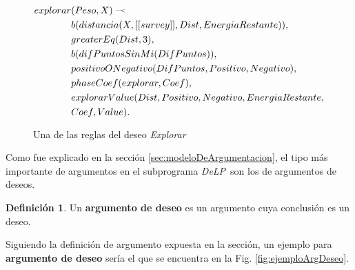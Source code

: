 \documentclass[oneside]{book}
\theoremstyle{definition}
\newtheorem{definicion}{Definición}[section]
\theoremstyle{example}
\newcommand{\DLP}{\mbox{\textit{DeLP}}}
\newcommand{\drule}[2]{\mbox{$ #1\; \defleftarrow \; #2$}}
\newcommand{\defleftarrow}{{\raise1.5pt\hbox{\tiny\defleft}}}
\newcommand{\defleft}{\mbox{---\hspace{-1.5pt}\raise.05pt\hbox{$<$}}}
\newcommand{\bigAS}[2]{$\bigl\langle \{#1\}, #2 \bigr\rangle $}
\newcommand{\nlA}[1]{$$\mbox{#1}$$}
\begin{document}
\begin{figure}
\begin{equation*}
\begin{aligned}
explorar&(Peso, X)\; \defleftarrow \;\\
	&b(distancia(X, [[survey]], Dist, EnergiaRestante)),\\
    &greaterEq(Dist, 3),\\
    &b(difPuntosSinMi(DifPuntos)),\\
    &positivoONegativo(DifPuntos, Positivo, Negativo),\\
    &phaseCoef(explorar, Coef),\\
    &explorarValue(Dist, Positivo, Negativo, EnergiaRestante, \\
    &Coef, Value).
\end{aligned}
\end{equation*}
\caption{Una de las reglas del deseo \emph{Explorar}}
\label{fig:deseoExplorar}
\end{figure}

Como fue explicado en la sección \ref{sec:modeloDeArgumentacion}, el tipo más importante de 
argumentos en el subprograma \DLP\ son los de argumentos de deseos. 

\begin{definicion}
	Un \textbf{argumento de deseo} es un argumento cuya conclusión es un deseo.
\end{definicion}

Siguiendo la definición de argumento expuesta en la sección, un ejemplo para
\textbf{argumento de deseo} sería el que se encuentra en la Fig. 
\ref{fig:ejemploArgDeseo}.

\end{document}
